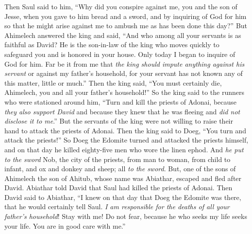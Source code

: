 \begin{biblechapter}
\verse Then Saul said to him, “Why did you conspire against me, you and the son of Jesse, when you gave to him bread and a sword, and by inquiring of God for him so that he might arise against me to ambush me as has been done this day?”
\verse But Ahimelech answered the king and said, “And who among all your servants is as faithful as David? He is the son-in-law of the king who moves quickly to safeguard you and is honored in your house.
\verse Only today I began to inquire of God for him. Far be it from me that \textit{the king should impute anything against his servant} or against my father’s household, for your servant has not known any of this matter, little or much.”
\verse Then the king said, “You must certainly die, Ahimelech, you and all your father’s household!”
\verse So the king said to the runners who were stationed around him, “Turn and kill the priests of Adonai, because \textit{they also support David} and because they knew that he was fleeing and \textit{did not disclose it to me}.” But the servants of the king were not willing to raise their hand to attack the priests of Adonai.
\verse Then the king said to Doeg, “You turn and attack the priests!” So Doeg the Edomite turned and attacked the priests himself, and on that day he killed eighty-five men who wore the linen ephod.
\verse And \textit{he put to the sword} Nob, the city of the priests, from man to woman, from child to infant, and ox and donkey and sheep; all \textit{to the sword}.
\verse But, one of the sons of Ahimelech the son of Ahitub, whose name was Abiathar, escaped and fled after David.
\verse Abiathar told David that Saul had killed the priests of Adonai.
\verse Then David said to Abiathar, “I knew on that day that Doeg the Edomite was there, that he would certainly tell Saul. \textit{I am responsible for the deaths of all your father’s household}!
\verse Stay with me! Do not fear, because he who seeks my life seeks your life. You are in good care with me.”
\end{biblechapter}

